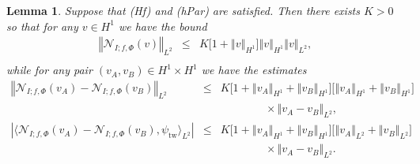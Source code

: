 \documentclass[10pt]{articleHJ}
\newcommand{\abs}[1]{\left\vert#1\right\vert}			%
\newcommand{\norm}[1]{\left\Vert#1\right\Vert}		%
\newtheorem{lem}[thm]{Lemma}
\numberwithin{equation}{section}
\begin{document}
\begin{lem}
Suppose that (Hf) and (hPar) are satisfied.
Then there exists $K > 0$ so that
for any $v \in H^1$ we have the bound
\begin{equation}
\label{eq:swv:glb:bnd:nf}
\begin{array}{lcl}
 \norm{\mathcal{N}_{I;f,\Phi}( v)}_{L^2} & \le &
   K \big[1 + \norm{v}_{H^1} \big]
     \norm{v}_{H^1} \norm{v}_{L^2} ,
\\[0.2cm]
\end{array}
\end{equation}
while for any pair $(v_A, v_B) \in H^1 \times H^1$
we have the estimates
\begin{equation}
\label{eq:swv:lip:bnd:nf}
\begin{array}{lcl}
\norm{\mathcal{N}_{I;f,\Phi}(v_A) - \mathcal{N}_{I;f,\Phi}(v_B) }_{L^2}
  & \le &
  K \big[ 1 + \norm{v_A}_{H^1} + \norm{v_B}_{H^1} \big]
    \big[ \norm{v_A}_{H^1}  + \norm{v_B}_{H^1} \big]
\\[0.2cm]
& & \qquad \qquad \times
     \norm{v_A-v_B}_{L^2} ,
\\[0.2cm]
\abs{\langle \mathcal{N}_{I;f,\Phi}( v_A )
  -  \mathcal{N}_{I;f,\Phi}(v_B), \psi_{\mathrm{tw}} \rangle_{L^2} }
 & \le &
  K \big[ 1 + \norm{v_A}_{H^1} + \norm{v_B}_{H^1} \big]
    \big[ \norm{v_A}_{L^2}  + \norm{v_B}_{L^2} \big]
\\[0.2cm]
& & \qquad \qquad \times
     \norm{v_A-v_B}_{L^2} .
\end{array}
\end{equation}
\end{lem}
\end{document}
